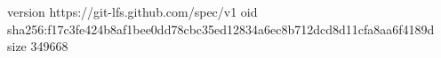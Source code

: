 version https://git-lfs.github.com/spec/v1
oid sha256:f17c3fe424b8af1bee0dd78cbc35ed12834a6ec8b712dcd8d11cfa8aa6f4189d
size 349668
